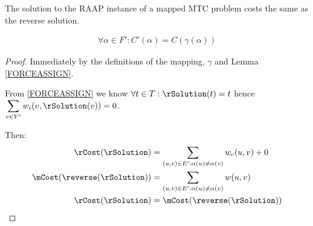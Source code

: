 \begin{lemma}
\label{REVERSECOST}
The solution to the RAAP instance of a mapped MTC problem costs the same as the reverse solution.

\begin{align}
	\nonumber \forall \alpha \in F' : C'(\alpha) = C(\gamma(\alpha))
\end{align}
\end{lemma}
\begin{proof}
Immediately by the definitions of the mapping, $\gamma$ and Lemma \ref{FORCEASSIGN}.

From \ref{FORCEASSIGN} we know $\forall t \in T : \rSolution(t) = t$ hence $\displaystyle\sum\limits_{v \in V'} w_i(v, \rSolution(v)) = 0$.

Then:
\begin{align}
	\nonumber \rCost(\rSolution) & = \displaystyle\sum\limits_{(u,v) \in E' : \alpha(u) \neq \alpha(v)} w_c(u,v) + 0 \\
	\nonumber \mCost(\reverse(\rSolution)) & = \displaystyle\sum\limits_{(u,v) \in E' : \alpha(u) \neq \alpha(v)} w(u,v) \\
	\nonumber \rCost(\rSolution) & = \mCost(\reverse(\rSolution))
\end{align}
\end{proof}

